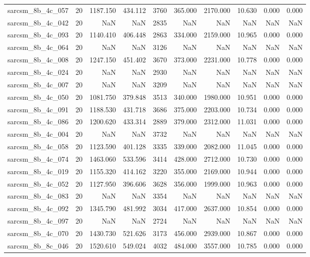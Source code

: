 \begin{tabular}{lrrrrrrrrr}
sarcsm\_8b\_4c\_057 & 20 & 1187.150 & 434.112 & 3760 & 365.000 & 2170.000 & 10.630 & 0.000 & 0.000 \\
sarcsm\_8b\_4c\_042 & 20 & NaN & NaN & 2835 & NaN & NaN & NaN & NaN & NaN \\
sarcsm\_8b\_4c\_093 & 20 & 1140.410 & 406.448 & 2863 & 334.000 & 2159.000 & 10.965 & 0.000 & 0.000 \\
sarcsm\_8b\_4c\_064 & 20 & NaN & NaN & 3126 & NaN & NaN & NaN & NaN & NaN \\
sarcsm\_8b\_4c\_008 & 20 & 1247.150 & 451.402 & 3670 & 373.000 & 2231.000 & 10.778 & 0.000 & 0.000 \\
sarcsm\_8b\_4c\_024 & 20 & NaN & NaN & 2930 & NaN & NaN & NaN & NaN & NaN \\
sarcsm\_8b\_4c\_007 & 20 & NaN & NaN & 3209 & NaN & NaN & NaN & NaN & NaN \\
sarcsm\_8b\_4c\_050 & 20 & 1081.750 & 379.848 & 3513 & 340.000 & 1980.000 & 10.951 & 0.000 & 0.000 \\
sarcsm\_8b\_4c\_091 & 20 & 1188.530 & 431.718 & 3686 & 375.000 & 2203.000 & 10.734 & 0.000 & 0.000 \\
sarcsm\_8b\_4c\_086 & 20 & 1200.620 & 433.314 & 2889 & 379.000 & 2312.000 & 11.031 & 0.000 & 0.000 \\
sarcsm\_8b\_4c\_004 & 20 & NaN & NaN & 3732 & NaN & NaN & NaN & NaN & NaN \\
sarcsm\_8b\_4c\_058 & 20 & 1123.590 & 401.128 & 3335 & 339.000 & 2082.000 & 11.045 & 0.000 & 0.000 \\
sarcsm\_8b\_4c\_074 & 20 & 1463.060 & 533.596 & 3414 & 428.000 & 2712.000 & 10.730 & 0.000 & 0.000 \\
sarcsm\_8b\_4c\_019 & 20 & 1155.320 & 414.162 & 3220 & 355.000 & 2169.000 & 10.944 & 0.000 & 0.000 \\
sarcsm\_8b\_4c\_052 & 20 & 1127.950 & 396.606 & 3628 & 356.000 & 1999.000 & 10.963 & 0.000 & 0.000 \\
sarcsm\_8b\_4c\_083 & 20 & NaN & NaN & 3354 & NaN & NaN & NaN & NaN & NaN \\
sarcsm\_8b\_4c\_092 & 20 & 1345.790 & 481.992 & 3034 & 417.000 & 2637.000 & 10.854 & 0.000 & 0.000 \\
sarcsm\_8b\_4c\_097 & 20 & NaN & NaN & 2724 & NaN & NaN & NaN & NaN & NaN \\
sarcsm\_8b\_4c\_070 & 20 & 1430.730 & 521.626 & 3173 & 456.000 & 2939.000 & 10.867 & 0.000 & 0.000 \\
sarcsm\_8b\_8c\_046 & 20 & 1520.610 & 549.024 & 4032 & 484.000 & 3557.000 & 10.785 & 0.000 & 0.000 \\

\end{tabular}
